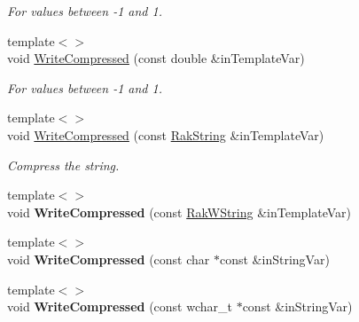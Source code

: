 \begin{DoxyCompactItemize}
\begin{DoxyCompactList}\small\item\em For values between -\/1 and 1. \end{DoxyCompactList}\item 
\hypertarget{class_rak_net_1_1_bit_stream_a96ea1b0e57f1ce372927fbace20f3f88}{{\footnotesize template$<$$>$ }\\void \hyperlink{class_rak_net_1_1_bit_stream_a96ea1b0e57f1ce372927fbace20f3f88}{Write\-Compressed} (const double \&in\-Template\-Var)}\label{class_rak_net_1_1_bit_stream_a96ea1b0e57f1ce372927fbace20f3f88}

\begin{DoxyCompactList}\small\item\em For values between -\/1 and 1. \end{DoxyCompactList}\item 
\hypertarget{class_rak_net_1_1_bit_stream_a177d488f81c3c30898ea8b9ef014f759}{{\footnotesize template$<$$>$ }\\void \hyperlink{class_rak_net_1_1_bit_stream_a177d488f81c3c30898ea8b9ef014f759}{Write\-Compressed} (const \hyperlink{class_rak_net_1_1_rak_string}{Rak\-String} \&in\-Template\-Var)}\label{class_rak_net_1_1_bit_stream_a177d488f81c3c30898ea8b9ef014f759}

\begin{DoxyCompactList}\small\item\em Compress the string. \end{DoxyCompactList}\item 
\hypertarget{class_rak_net_1_1_bit_stream_a60d6420a16604eed15e52d9bb6ca3005}{{\footnotesize template$<$$>$ }\\void {\bfseries Write\-Compressed} (const \hyperlink{class_rak_net_1_1_rak_w_string}{Rak\-W\-String} \&in\-Template\-Var)}\label{class_rak_net_1_1_bit_stream_a60d6420a16604eed15e52d9bb6ca3005}

\item 
\hypertarget{class_rak_net_1_1_bit_stream_aafcfe15840b13dbc4f229db0e43bff34}{{\footnotesize template$<$$>$ }\\void {\bfseries Write\-Compressed} (const char $\ast$const \&in\-String\-Var)}\label{class_rak_net_1_1_bit_stream_aafcfe15840b13dbc4f229db0e43bff34}

\item 
\hypertarget{class_rak_net_1_1_bit_stream_a4f825f4573fa9c52dae0ff037f5d2623}{{\footnotesize template$<$$>$ }\\void {\bfseries Write\-Compressed} (const wchar\-\_\-t $\ast$const \&in\-String\-Var)}\label{class_rak_net_1_1_bit_stream_a4f825f4573fa9c52dae0ff037f5d2623}


\end{DoxyCompactItemize}
